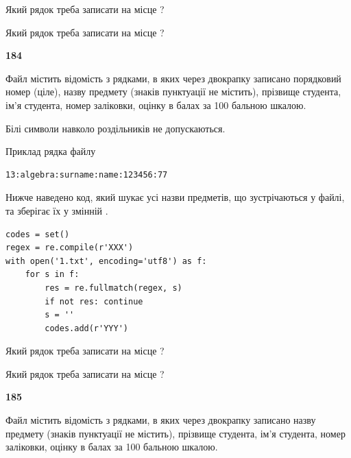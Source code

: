 Який рядок треба записати на місце  ?\par
\vspace{5mm}


Який рядок треба записати на місце  ?\par


\newpage

{\begin {center}\textbf{ 184}\end {center}}\par
Файл  містить відомість з рядками, в яких через двокрапку записано поряд\-ковий номер (ціле), назву предмету (знаків пунктуації не містить), прізвище студента, ім'я студента, номер заліковки, оцінку в балах за 100 бальною шкалою.

Білі символи навколо роздільників не допускаються.

Приклад рядка файлу



\begin{verbatim}
13:algebra:surname:name:123456:77
\end{verbatim}


Нижче наведено код, який шукає усі назви предметів, що зустрічаються у файлі, та зберігає їх у змінній .



\begin{verbatim}
codes = set()
regex = re.compile(r'XXX')
with open('1.txt', encoding='utf8') as f:
    for s in f:
        res = re.fullmatch(regex, s)
        if not res: continue
        s = ''
        codes.add(r'YYY')
\end{verbatim}





Який рядок треба записати на місце  ?\par
\vspace{5mm}


Який рядок треба записати на місце  ?\par


\newpage

{\begin {center}\textbf{ 185}\end {center}}\par
Файл  містить відомість з рядками, в яких через двокрапку записа\-но назву предмету (знаків пунктуації не містить), прізвище студента, ім'я студента, номер залі\-ков\-ки, оцінку в балах за 100 бальною шкалою.


